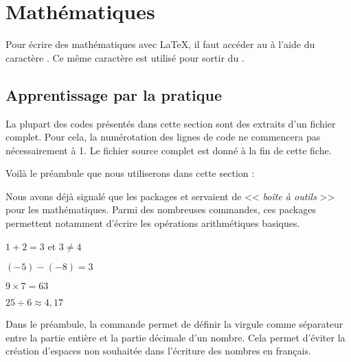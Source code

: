 \renewcommand\MaCouleur{Plum}
\newcommand\NomClasse[1]{{\small\textbf{\textsf{#1}}}\xspace}
\chapter{Mathématiques}
\thispagestyle{empty}

\begin{info}
    Pour écrire des mathématiques avec \LaTeX, il faut accéder au  à l'aide du caractère \ordi{\$}. Ce même caractère est utilisé pour sortir du .
\end{info}

\section{Apprentissage par la pratique}

\begin{info}
	La plupart des codes présentés dans cette section sont des extraits d'un fichier complet. Pour cela, la numérotation des lignes de code ne commencera pas nécessairement à 1. Le fichier source complet est donné à la fin de cette fiche.
\end{info}

Voilà le préambule que nous utiliserons dans cette section :


Nous avons déjà signalé que les packages  et  servaient de << \textit{boîte à outils} >> pour les mathématiques. Parmi des nombreuses commandes, ces packages permettent notamment d'écrire les opérations arithmétiques basiques.\bigskip

{\NewFont
\begin{SideBySideExample}
    $1 + 2 = 3$ et $3 \neq 4$\par
    $(-5) - (-8) = 3$ \par
    $9 \times 7 = 63$\par
    $25 \div 6 \approx 4,17$
\end{SideBySideExample}
}\bigskip

\begin{info}
    Dans le préambule, la commande  permet de définir la virgule comme séparateur entre la partie entière et la partie décimale d'un nombre. Cela permet d'éviter la création d'espaces non souhaitée dans l'écriture des nombres en français.
\end{info}\medskip

